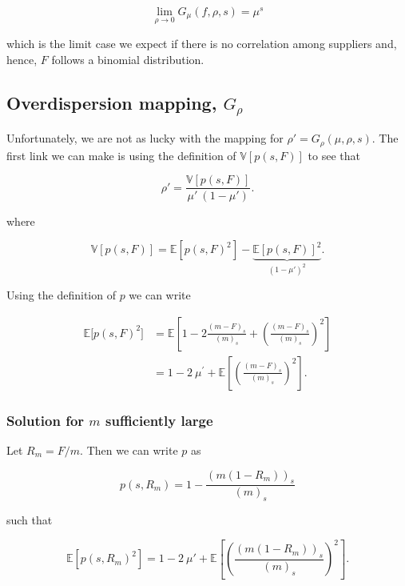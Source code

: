 \documentclass[american, abstract=on]{scrartcl}
\theoremstyle{plain}
\newcommand{\E}{\mathbb{E}}
\newcommand{\V}{\mathbb{V}}
\begin{document}
\begin{equation}
    \lim_{\rho \rightarrow 0} G_\mu(f, \rho, s) = \mu^s
\end{equation}

which is the limit case we expect if there is no correlation among suppliers and, hence, $F$ follows a binomial distribution.

\subsection[Overdispersion mapping]{Overdispersion mapping, $G_\rho$}

Unfortunately, we are not as lucky with the mapping for $\rho' = G_{\rho}(\mu, \rho, s)$. The first link we can make is using the definition of $\V[p(s, F)]$ to see that

\begin{equation}
    \rho' = \frac{\V[p(s, F)]}{\mu' \ (1 - \mu')}.
\end{equation}

where

\begin{equation}
    \V[p(s, F)] = \E[p(s, F)^2] - \underbrace{\E[p(s, F)]^2}_{\left(1 - \mu'\right)^2}.
\end{equation}

Using the definition of $p$ we can write

\begin{equation}
    \begin{split}
        \E\big[ p(s, F)^2 \big] &= \E\left[1 - 2 \frac{(m - F)_s}{(m)_s} + \left(\frac{(m - F)_s}{(m)_s}  \right)^2\right] \\
        &= 1 - 2 \ \mu^\prime + \E\left[ \left(\frac{(m - F)_s}{(m)_s}  \right)^2 \right].
    \end{split}
\end{equation}

\subsubsection[Solution for m sufficiently large]{Solution for $m$ sufficiently large}

Let $R_m = F / m$. Then we can write $p$ as

\begin{equation}
    p(s, R_m) = 1 - \frac{(m(1- R_m))_s}{(m)_s}
\end{equation}

such that

\begin{equation}
   \E \left[p(s, R_m)^2\right] = 1 - 2 \ \mu' + \E\left[\left(\frac{(m(1- R_m))_s}{(m)_s} \right)^2\right].
\end{equation}
\end{document}
